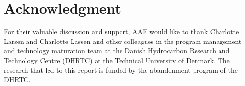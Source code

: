 \documentclass{ECOS_2021}
\begin{document}
\sffamily \Large \section*{Acknowledgment}
\rmfamily \normalsize
For their valuable discussion and support, AAE would like to thank
Charlotte Larsen and Charlotte Lassen and other colleagues in the
program management and technology maturation team at the Danish Hydrocarbon
Research and Technology Centre (DHRTC) at the Technical University
of Denmark. The research that led to this report is funded by the
abandonment program of the DHRTC.

\sffamily \Large
\rmfamily \normalsize


\end{document}
